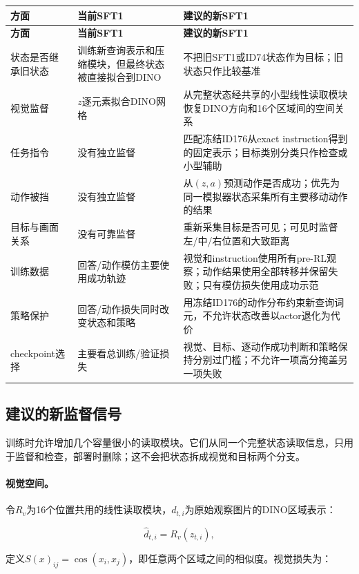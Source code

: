 \documentclass[UTF8,11pt,a4paper,fontset=none]{ctexart}
\begin{document}
\begin{longtable}{p{3.0cm}p{5.6cm}p{6.0cm}}
\toprule
\textbf{方面} & \textbf{当前SFT1} & \textbf{建议的新SFT1} \\
\midrule
\endfirsthead
\toprule
\textbf{方面} & \textbf{当前SFT1} & \textbf{建议的新SFT1} \\
\midrule
\endhead
状态是否继承旧状态 & 训练新查询表示和压缩模块，但最终状态被直接拟合到DINO & 不把旧SFT1或ID74状态作为目标；旧状态只作比较基准 \\
视觉监督 & $z$逐元素拟合DINO网格 & 从完整状态经共享的小型线性读取模块恢复DINO方向和16个区域间的空间关系 \\
任务指令 & 没有独立监督 & 匹配冻结ID176从exact instruction得到的固定表示；目标类别分类只作检查或小型辅助 \\
动作被挡 & 没有独立监督 & 从$(z,a)$预测动作是否成功；优先为同一模拟器状态采集所有主要移动动作的结果 \\
目标与画面关系 & 没有可靠监督 & 重新采集目标是否可见；可见时监督左/中/右位置和大致距离 \\
训练数据 & 回答/动作模仿主要使用成功轨迹 & 视觉和instruction使用所有pre-RL观察；动作结果使用全部转移并保留失败；只有模仿损失使用成功示范 \\
策略保护 & 回答/动作损失同时改变状态和策略 & 用冻结ID176的动作分布约束新查询词元，不允许状态改善以actor退化为代价 \\
checkpoint选择 & 主要看总训练/验证损失 & 视觉、目标、逐动作成功判断和策略保持分别过门槛；不允许一项高分掩盖另一项失败 \\
\bottomrule
\end{longtable}

\subsection{建议的新监督信号}

训练时允许增加几个容量很小的读取模块。它们从同一个完整状态读取信息，只用于监督和检查，部署时删除；这不会把状态拆成视觉和目标两个分支。

\paragraph{视觉空间。}
令$R_v$为16个位置共用的线性读取模块，$d_{t,i}$为原始观察图片的DINO区域表示：

\begin{equation}
  \hat d_{t,i}=R_v(z_{t,i}),
\end{equation}

定义$S(x)_{ij}=\cos(x_i,x_j)$，即任意两个区域之间的相似度。视觉损失为：
\end{document}
